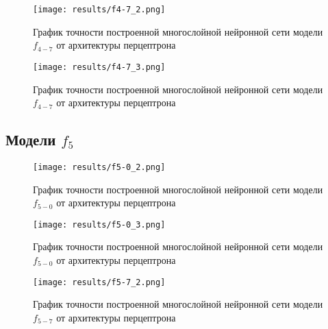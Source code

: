 \bigskip


\begin{figure}[H]
	\texttt{[image: results/f4-7\_2.png]}
	
	\caption{График точности построенной многослойной нейронной сети модели $f_{4-7}$ от архитектуры перцептрона}
	
\end{figure}


\begin{figure}[H]
	\texttt{[image: results/f4-7\_3.png]}
	
	\caption{График точности построенной многослойной нейронной сети модели $f_{4-7}$ от архитектуры перцептрона}	
\end{figure}


\subsection{Модели $f_{5}$}

\bigskip


\begin{figure}[H]
	\texttt{[image: results/f5-0\_2.png]}
	
	\caption{График точности построенной многослойной нейронной сети модели $f_{5-0}$ от архитектуры перцептрона}
	
\end{figure}


\begin{figure}[H]
	\texttt{[image: results/f5-0\_3.png]}
	
	\caption{График точности построенной многослойной нейронной сети модели $f_{5-0}$ от архитектуры перцептрона}
\end{figure}



\bigskip


\begin{figure}[H]
	\texttt{[image: results/f5-7\_2.png]}
	
	\caption{График точности построенной многослойной нейронной сети модели $f_{5-7}$ от архитектуры перцептрона}
	
\end{figure}


